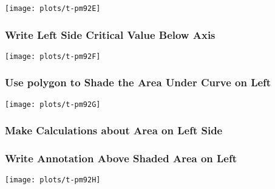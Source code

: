 \documentclass[11pt,english]{beamer}
\begin{document}

\begin{frame}[plain]

\texttt{[image: plots/t-pm92E]}
\end{frame}


\begin{frame}
  \frametitle{Write Left Side Critical Value Below Axis}


\end{frame}


\begin{frame}[plain]

\texttt{[image: plots/t-pm92F]}
\end{frame}


\begin{frame}
  \frametitle{Use polygon to Shade the Area Under Curve on Left}


\end{frame}



\begin{frame}[plain]

\texttt{[image: plots/t-pm92G]}
\end{frame}


\begin{frame}
  \frametitle{Make Calculations about Area on Left Side}


\end{frame}


\begin{frame}
  \frametitle{Write Annotation Above Shaded Area on Left}
  
\end{frame}

\begin{frame}[plain]

\texttt{[image: plots/t-pm92H]}
\end{frame}
\end{document}
